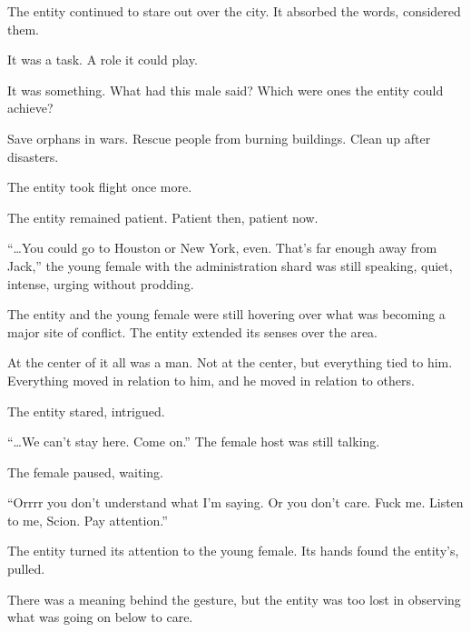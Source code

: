 The entity continued to stare out over the city.  It absorbed the words, considered them.



It was a task.  A role it could play.



It was something.  What had this male said?  Which were ones the entity could achieve?



Save orphans in wars.  Rescue people from burning buildings.  Clean up after disasters.



The entity took flight once more.



\sectionbreak



The entity remained patient.  Patient then, patient now.



``\ldots{}You could go to Houston or New York, even.  That's far enough away from Jack,'' the young female with the administration shard was still speaking, quiet, intense, urging without prodding.



The entity and the young female were still hovering over what was becoming a major site of conflict.  The entity extended its senses over the area.



At the center of it all was a man.  Not at the center, but everything tied to him.  Everything moved in relation to him, and he moved in relation to others.



The entity stared, intrigued.



``\ldots{}We can't stay here.  Come on.''  The female host was still talking.



The female paused, waiting.



``Orrrr you don't understand what I'm saying.  Or you don't care.  Fuck me.  Listen to me, Scion.  Pay attention.''



The entity turned its attention to the young female.  Its hands found the entity's, pulled.



There was a meaning behind the gesture, but the entity was too lost in observing what was going on below to care.



